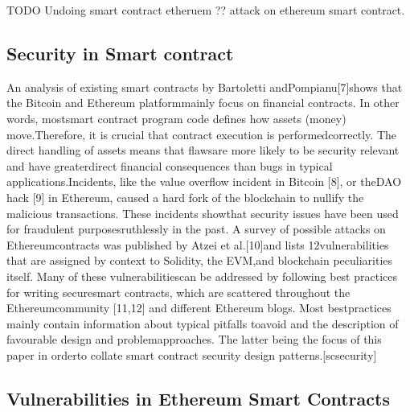 TODO
Undoing smart contract etheruem ??
attack on ethereum smart contract.
\subsection{Security in Smart contract}

An  analysis  of  existing  smart  contracts  by  Bartoletti  andPompianu[7]shows that the Bitcoin and Ethereum platformmainly  focus  on  financial  contracts.  In  other  words,  mostsmart contract program code defines how assets (money) move.Therefore,  it  is  crucial  that  contract  execution  is  performedcorrectly.  The  direct  handling  of  assets  means  that  flawsare  more  likely  to  be  security  relevant  and  have  greaterdirect financial consequences than bugs in typical applications.Incidents, like the value overflow incident in Bitcoin [8], or theDAO hack [9] in Ethereum, caused a hard fork of the blockchain
to  nullify  the  malicious  transactions.  These  incidents  showthat  security  issues  have  been  used  for  fraudulent  purposesruthlessly in the past. A survey of possible attacks on Ethereumcontracts  was  published  by  Atzei  et  al.[10]and  lists  12vulnerabilities that are assigned by context to Solidity, the EVM,and blockchain peculiarities itself. Many of these vulnerabilitiescan be addressed by following best practices for writing securesmart contracts, which are scattered throughout the Ethereumcommunity [11,12] and different Ethereum blogs. Most bestpractices mainly contain information about typical pitfalls toavoid and the description of favourable design and problemapproaches. The latter being the focus of this paper in orderto collate smart contract security design patterns.[scsecurity]
\subsection{Vulnerabilities in Ethereum Smart Contracts}

